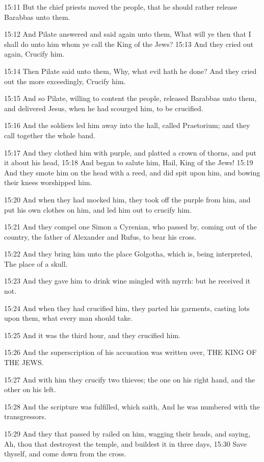 15:11 But the chief priests moved the people, that he should rather
release Barabbas unto them.

15:12 And Pilate answered and said again unto them, What will ye then
that I shall do unto him whom ye call the King of the Jews?  15:13 And
they cried out again, Crucify him.

15:14 Then Pilate said unto them, Why, what evil hath he done? And
they cried out the more exceedingly, Crucify him.

15:15 And so Pilate, willing to content the people, released Barabbas
unto them, and delivered Jesus, when he had scourged him, to be
crucified.

15:16 And the soldiers led him away into the hall, called Praetorium;
and they call together the whole band.

15:17 And they clothed him with purple, and platted a crown of thorns,
and put it about his head, 15:18 And began to salute him, Hail, King
of the Jews!  15:19 And they smote him on the head with a reed, and
did spit upon him, and bowing their knees worshipped him.

15:20 And when they had mocked him, they took off the purple from him,
and put his own clothes on him, and led him out to crucify him.

15:21 And they compel one Simon a Cyrenian, who passed by, coming out
of the country, the father of Alexander and Rufus, to bear his cross.

15:22 And they bring him unto the place Golgotha, which is, being
interpreted, The place of a skull.

15:23 And they gave him to drink wine mingled with myrrh: but he
received it not.

15:24 And when they had crucified him, they parted his garments,
casting lots upon them, what every man should take.

15:25 And it was the third hour, and they crucified him.

15:26 And the superscription of his accusation was written over, THE
KING OF THE JEWS.

15:27 And with him they crucify two thieves; the one on his right
hand, and the other on his left.

15:28 And the scripture was fulfilled, which saith, And he was
numbered with the transgressors.

15:29 And they that passed by railed on him, wagging their heads, and
saying, Ah, thou that destroyest the temple, and buildest it in three
days, 15:30 Save thyself, and come down from the cross.

